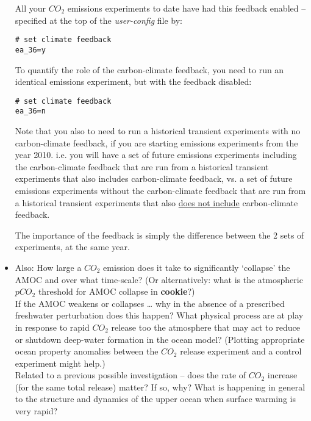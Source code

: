 \begin{itemize}[noitemsep]
All your \(CO_{2}\) emissions experiments to date have had this feedback enabled -- specified at the top of the \textit{user-config} file by:
\vspace{-2pt}\small\begin{verbatim}
# set climate feedback
ea_36=y
\end{verbatim}\normalsize\vspace{-2pt}

To quantify the role of the carbon-climate feedback, you need to run an identical emissions experiment, but with the feedback disabled:
\vspace{-2pt}\small\begin{verbatim}
# set climate feedback
ea_36=n
\end{verbatim}\normalsize\vspace{-2pt}

Note that you also to need to run a historical transient experiments with no carbon-climate feedback, if you are starting emissions experiments from the year 2010. i.e. you will have a set of future emissions experiments including the carbon-climate feedback that are run from a historical transient experiments that also includes carbon-climate feedback, vs. a set of future emissions experiments without the carbon-climate feedback that are run from a historical transient experiments that also \uline{does not include} carbon-climate feedback.

\vspace{1mm}

The importance of the feedback is simply the difference between the 2 sets of experiments, at the same year.

\vspace{1mm}
\item Also: How large a \(CO_{2}\) emission does it take to significantly ‘collapse’ the AMOC and over what time-scale? (Or alternatively: what is the atmospheric \(pCO_{2}\) threshold for AMOC collapse in \textbf{cookie}?)
\\ If the AMOC weakens or collapses … why in the absence of a prescribed freshwater perturbation does this happen? What physical process are at play in response to rapid \(CO_{2}\) release too the atmosphere that may act to reduce or shutdown deep-water formation in the ocean model? (Plotting appropriate ocean property anomalies between the \(CO_{2}\) release experiment and a control experiment might help.)
\\Related to a previous possible investigation -- does the rate of \(CO_{2}\) increase (for the same total release) matter? If so, why? What is happening in general to the structure and dynamics of the upper ocean when surface warming is very rapid?

\end{itemize}

